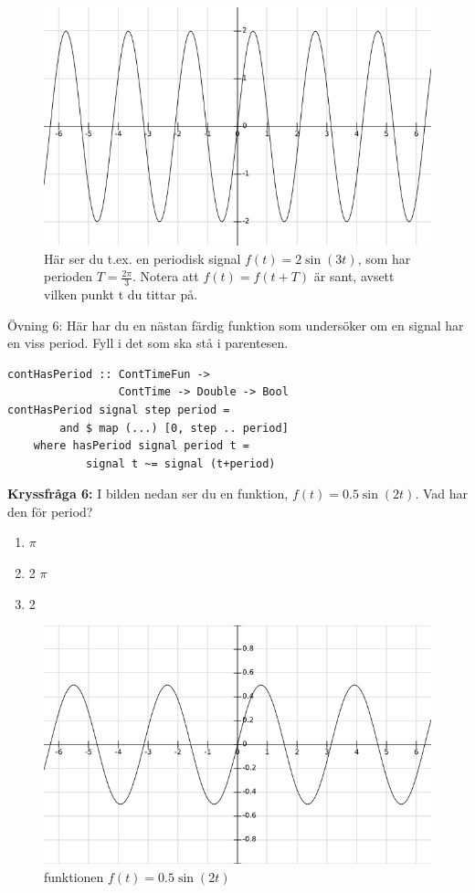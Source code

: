 \documentclass{article}
\begin{document}
\begin{figure}[ht]
\centerline{\includegraphics[scale=0.55]{image12.png}}
\caption{Här ser du t.ex. en periodisk signal $f(t)=2 \sin(3 t)$,
  som har perioden $T=\frac{2\pi}{3}$. Notera att $f(t)=f(t+T)$ är sant,
  avsett vilken punkt t du tittar på.}
\label{}
\end{figure}
\newpage
Övning 6: Här har du en nästan färdig funktion som undersöker om en
signal har en viss period. Fyll i det som ska stå i parentesen.
\begin{verbatim}
contHasPeriod :: ContTimeFun ->
                 ContTime -> Double -> Bool
contHasPeriod signal step period =
        and $ map (...) [0, step .. period]
    where hasPeriod signal period t =
            signal t ~= signal (t+period)
\end{verbatim}

\textbf{Kryssfråga 6:} I bilden nedan ser du en funktion,
$f(t)=0.5\sin(2t)$. Vad har den för period?
\begin{enumerate}[label={\alph*)},font={\bfseries}]
    \item $\pi$
    \item 2 $\pi$
    \item 2
\end{enumerate}

\begin{figure}[ht]
\centerline{\includegraphics[scale=0.50]{image08.png}}
\caption{funktionen $f(t) = 0.5 \sin(2t)$}
\label{}
\end{figure}
\end{document}
